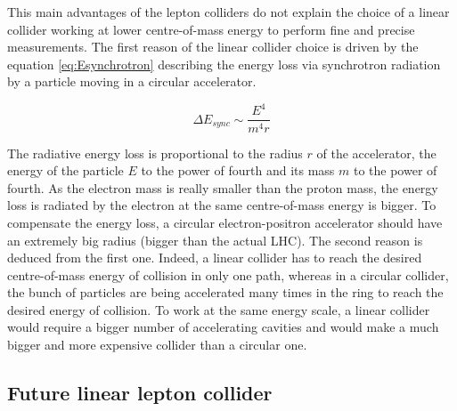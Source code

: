     This main advantages of the lepton colliders do not explain the choice of a linear collider working at lower centre-of-mass energy to perform fine and precise measurements.
    The first reason of the linear collider choice is driven by the equation \ref{eq:Esynchrotron} describing the energy loss via synchrotron radiation by a particle moving in a circular accelerator.
    
    \begin{equation}
     \Delta E_{sync} \sim \frac{E^4}{m^4r}
       \label{eq:Esynchrotron}
    \end{equation} 

    The radiative energy loss is proportional to the radius $r$ of the accelerator, the energy of the particle $E$ to the power of fourth and its mass $m$ to the power of fourth.
    As the electron mass is really smaller than the proton mass, the energy loss is radiated by the electron at the same centre-of-mass energy is bigger.  
    To compensate the energy loss, a circular electron-positron accelerator should have an extremely big radius (bigger than the actual \gls{LHC}). 
    The second reason is deduced from the first one.
    Indeed, a linear collider has to reach the desired centre-of-mass energy of collision in only one path, whereas in a circular collider, the bunch of particles are being accelerated many times in the ring to reach the desired energy of collision.
    To work at the same energy scale, a linear collider would require a bigger number of accelerating cavities and would make a much bigger and more expensive collider than a circular one.

    \subsection{Future linear lepton collider}

